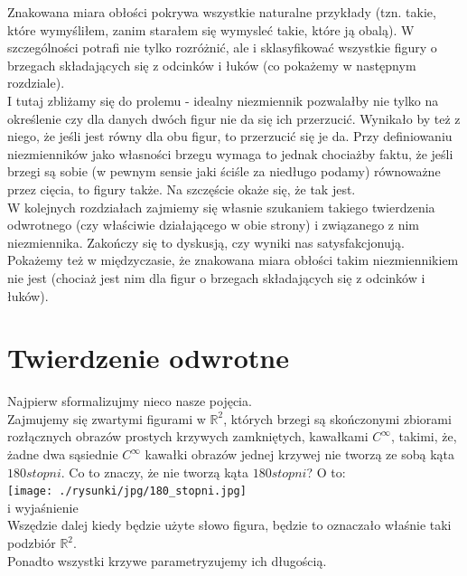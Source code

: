 \documentclass[a4paper, 12pt]{article}
\newcommand{\rysunek}[1]{\hfill \break\\[16pt] \Huge \textbf{\textcolor{violet}{Brakujący rysunek \normalsize
#1}} \hfill
\break \\[16pt] \normalsize}
\begin{document}
 Znakowana miara obłości pokrywa wszystkie naturalne przykłady (tzn. takie, które wymyśliłem, zanim starałem
 się wymysleć takie, które ją obalą). W szczególności potrafi nie tylko rozróżnić, ale i sklasyfikować
 wszystkie figury o brzegach składających się z odcinków i łuków (co pokażemy w następnym rozdziale). \\
 I tutaj zbliżamy się do prolemu - idealny niezmiennik pozwalałby nie tylko na określenie czy dla danych
 dwóch figur nie da się ich przerzucić. Wynikało by też z niego, że jeśli jest równy dla obu figur, to
 przerzucić się je da. Przy definiowaniu niezmienników jako własności brzegu wymaga to jednak chociażby
 faktu, że jeśli brzegi są sobie (w pewnym sensie jaki ściśle za niedługo podamy) równoważne przez cięcia,
 to figury także. Na szczęście okaże się, że tak jest. \\
 W kolejnych rozdziałach zajmiemy się własnie szukaniem takiego twierdzenia odwrotnego (czy właściwie
 działającego w obie strony) i związanego z nim niezmiennika. Zakończy się to dyskusją, czy wyniki nas
 satysfakcjonują. \\
 Pokażemy też w międzyczasie, że znakowana miara obłości takim niezmiennikiem nie jest (chociaż jest nim
 dla figur o brzegach składających się z odcinków i łuków).
\section{Twierdzenie odwrotne}
Najpierw sformalizujmy nieco nasze pojęcia. \\
Zajmujemy się zwartymi figurami w $\mathbb{R}^2$, których brzegi są skończonymi zbiorami rozłącznych obrazów
prostych krzywych
zamkniętych, kawałkami $C^\infty$, takimi, że, żadne dwa sąsiednie $C^\infty$
kawałki obrazów jednej krzywej
nie tworzą ze sobą kąta $180 stopni$. Co to znaczy, że nie tworzą kąta $180 stopni$? O to: \\
\texttt{[image: ./rysunki/jpg/180\_stopni.jpg]} \\
i wyjaśnienie \\

Wszędzie dalej kiedy będzie użyte słowo figura, będzie to oznaczało właśnie taki podzbiór $\mathbb{R}^2$. \\
Ponadto wszystki krzywe parametryzujemy ich długością.
\end{document}
